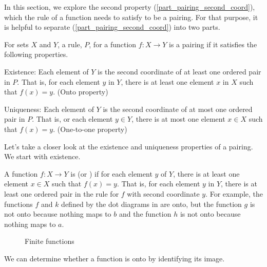 In this section, we explore the second property  (\ref{part_pairing_second_coord}), which the rule of a function needs to satisfy to be a pairing.  For that purpose, it is helpful to separate  (\ref{part_pairing_second_coord}) into two parts. 

\begin{rem}
\label{rem_pairings_as_fns}
    For sets $X$ and $Y$, a rule, $P$, for a function $f:X \to Y$ is a pairing if it satisfies the following properties.
        \begin{apart}
            \item \label{part_existence_onto} Existence:  Each element of $Y$ is the second coordinate of at least one ordered pair in $P$. That is, for each element $y$ in $Y$, there is at least one element $x$ in $X$ such that $f(x) = y$.  (Onto property)
            \item \label{part_uniqueness_1to1} Uniqueness: Each element of $Y$ is the second coordinate of at most one ordered pair in $P$. That is, or each element $y \in Y$, there is at most one element $x \in X$ such that $f(x)=y$.  (One-to-one property)
        \end{apart} 
\end{rem}

Let's take a closer look at the existence and uniqueness properties of a pairing. We start with existence.

\begin{defn}[Onto]
\label{defn_onto}
    A function $f: X \to Y$ is  (or ) if for each element $y$ of $Y$, there is at least one element $x \in X$ such that $f(x) =y$. That is, for each element $y$ in $Y$, there is at least one ordered pair in the rule for $f$ with second coordinate $y$. For example, the functions $f$ and $k$ defined by the dot diagrams in  are onto, but the function $g$ is not onto because nothing maps to $b$ and the function $h$ is not onto because nothing maps to $a$.
        \begin{figure}[hbtp]
            \centering
            
            \caption{Finite functions}
            \label{fig_finite_functions}
        \end{figure}
\end{defn}

We can determine whether a function is onto by identifying its image.

